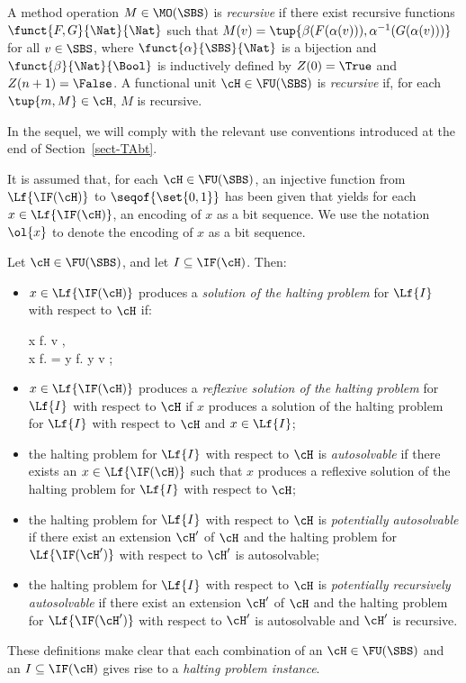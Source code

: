 \documentclass[fleqn]{llncs}
\begin{document}
A method operation $M \in \MO(\SBS)$ is \emph{recursive} if there exist
recursive functions $\funct{F,G}{\Nat}{\Nat}$ such that
$M(v) = \tup{\beta(F(\alpha(v))),\alpha^{-1}(G(\alpha(v)))}$ for all
$v \in \SBS$,
where $\funct{\alpha}{\SBS}{\Nat}$ is a bijection and
$\funct{\beta}{\Nat}{\Bool}$ is inductively defined by $Z(0) = \True$
and $Z(n + 1) = \False$.
A functional unit $\cH \in \FU(\SBS)$ is \emph{recursive} if, for each
$\tup{m,M} \in \cH$, $M$ is recursive.

In the sequel, we will comply with the relevant use conventions
introduced at the end of Section~\ref{sect-TAbt}.

It is assumed that, for each $\cH \in \FU(\SBS)$, an injective function
from $\Lf{\IF(\cH)}$ to $\seqof{\set{0,1}}$ has been given that yields
for each $x \in \Lf{\IF(\cH)}$, an encoding of $x$ as a bit sequence.
We use the notation $\ol{x}$ to denote the encoding of $x$ as a bit
sequence.

Let $\cH \in \FU(\SBS)$, and let $I \subseteq \IF(\cH)$.
Then:
\begin{itemize}
\item
$x \in \Lf{\IF(\cH)}$ produces a
\emph{solution of the halting problem} for $\Lf{I}$ with respect to
$\cH$ if:
\begin{ldispl}
x \cvg f.\; \; v \in \SBS\;, \\
x \sfreply f. = \True \Iff
y \cvg f.\; \;
y \in {}\; \; v \in {}\;;
\end{ldispl}
\item
$x \in \Lf{\IF(\cH)}$ produces a
\emph{reflexive solution of the halting problem} for $\Lf{I}$ with
respect to $\cH$ if $x$ produces a solution of the halting problem for
$\Lf{I}$ with respect to $\cH$ and $x \in \Lf{I}$;
\item
the halting problem for $\Lf{I}$ with respect to $\cH$ is
\emph{autosolvable} if there exists an $x \in \Lf{\IF(\cH)}$ such that
$x$ produces a reflexive solution of the halting problem for $\Lf{I}$
with respect to $\cH$;
\item
the halting problem for $\Lf{I}$ with respect to $\cH$ is
\emph{potentially autosolvable} if there exist an extension $\cH'$ of
$\cH$ and the halting problem for $\Lf{\IF(\cH')}$ with respect to
$\cH'$ is autosolvable;
\item
the halting problem for $\Lf{I}$ with respect to $\cH$ is
\emph{potentially recursively autosolvable} if there exist an extension
$\cH'$ of $\cH$ and the halting problem for $\Lf{\IF(\cH')}$ with
respect to $\cH'$ is autosolvable and $\cH'$ is recursive.
\end{itemize}
These definitions make clear that each combination of an
$\cH \in \FU(\SBS)$ and an $I \subseteq \IF(\cH)$ gives rise to a
\emph{halting problem instance}.
\end{document}
